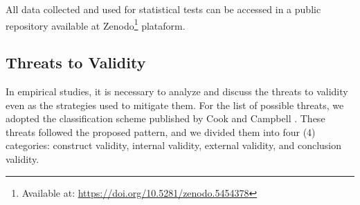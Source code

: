 All data collected and used for statistical tests can be accessed in a public repository available at Zenodo\footnote{Available at: \url{https://doi.org/10.5281/zenodo.5454378}} plataform.

\subsection{Threats to Validity}
\label{ssec_experiments:preliminary_threats}

In empirical studies, it is necessary to analyze and discuss the threats to validity even as the strategies used to mitigate them.
For the list of possible threats, we adopted the classification scheme published by Cook and Campbell \cite{Cook:1979}. 
These threats followed the proposed pattern, and we divided them into four (4) categories: construct validity, internal validity, external validity, and conclusion validity.

